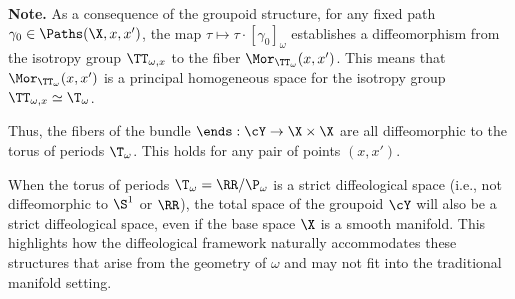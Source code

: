 \begin{article}
    \smallskip
    \textbf{Note.}
    As a consequence of the groupoid structure,
    for any fixed path $\gamma_0 \in \Paths(\X,x,x')$,
    the map $\tau \mapsto \tau \cdot [\gamma_0]_\omega$ establishes a diffeomorphism from the isotropy group $\TT_{\omega,x}$ to the fiber $\Mor_{\TT_\omega}(x,x')$.
    This means that $\Mor_{\TT_\omega}(x,x')$ is a principal homogeneous space for the isotropy group $\TT_{\omega,x} \simeq \T_\omega$.
    
    Thus,
    the fibers of the bundle $\ends: \cY \to \X \times \X$ are all diffeomorphic to the torus of periods $\T_\omega$.
    This holds for any pair of points $(x,x')$.
    
    When the torus of periods $\T_\omega = \RR/\P_\omega$ is a strict diffeological space (i.e., not diffeomorphic to $\S^1$ or $\RR$),
    the total space of the groupoid $\cY$ will also be a strict diffeological space,
    even if the base space $\X$ is a smooth manifold.
    This highlights how the diffeological framework naturally accommodates these structures that arise from the geometry of $\omega$ and may not fit into the traditional manifold setting.
    
  \end{article}
  
  
